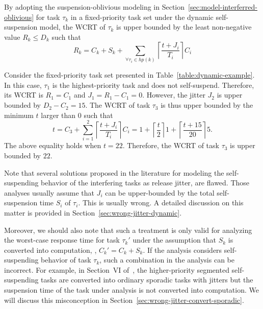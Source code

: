 By adopting the suspension-oblivious modeling in Section~\ref{sec:model-interferred-oblivious} for task $\tau_k$ in a fixed-priority task set under the dynamic self-suspension model, the WCRT of $\tau_k$ is upper bounded by the least non-negative value $R_k \leq D_k$ such that 
\begin{equation*}
R_k=C_k+S_k+ \sum_{\forall \tau_i \in hp(k)} \left\lceil \frac{t + J_i}{T_i} \right\rceil C_i
\end{equation*} 


\begin{example}
\label{ex:suspension-jitter}    
Consider the fixed-priority task set presented in Table~\ref{table:dynamic-example}. In this case, $\tau_1$ is the highest-priority task and does not self-suspend. Therefore, its WCRT is $R_1 = C_1$ and $J_1 = R_1 - C_1 = 0$. However, the jitter $J_2$ is upper bounded by $D_2 - C_2 =15$. The WCRT of task $\tau_3$ is thus upper bounded by the minimum $t$ larger than $0$ such that 
$$t=C_3+ \sum_{i=1}^2\left\lceil \frac{t + J_i}{T_i} \right\rceil C_i = 1+\left\lceil \frac{t}{2} \right\rceil 1 +\left\lceil \frac{t+15}{20} \right\rceil 5.$$ 
The above equality holds when $t=22$. Therefore, the WCRT of task $\tau_{3}$ is upper bounded by $22$.
\hfill\myendproof  
\end{example}

Note that several solutions proposed in the literature \cite{ECRTS-AudsleyB04,RTAS-AudsleyB04,RTCSA-KimCPKH95} for modeling the 
self-suspending behavior of the interfering tasks as release jitter, are flawed. Those analyses usually assume that $J_i$ can be 
upper-bounded by the total self-suspension time $S_i$ of $\tau_i$. This is usually wrong. A detailed discussion on this matter is 
provided in Section~\ref{sec:wrong-jitter-dynamic}. 

Moreover, we should also note that such a treatment is only valid for
analyzing the worst-case response time for task $\tau_k'$ under the
assumption that $S_k$ is converted into computation, \ie, $C_k'=C_k+S_k$. If the analysis
considers self-suspending behavior of task $\tau_k$, such a
combination in the analysis can be incorrect. For example, in Section~VI of~\cite{ecrts15nelissen},
the higher-priority segmented self-suspending tasks are converted into ordinary sporadic tasks with jitters 
but the suspension time of the task under analysis is not converted into computation. 
We will discuss this misconception in Section~\ref{sec:wrong-jitter-convert-sporadic}.
 



